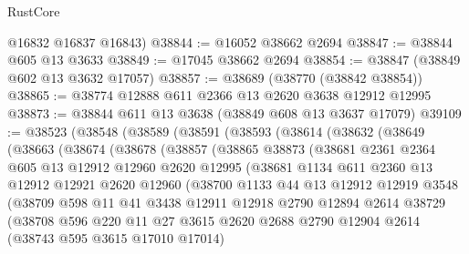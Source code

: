 \begin{lexlean}{RustCore}
\begin{coremodule}
      @16832
      @16837
      @16843)
@38844 := @16052 @38662 @2694
@38847 := @38844 @605 @13 @3633
@38849 := @17045 @38662 @2694
@38854 := @38847 (@38849 @602 @13 @3632 @17057)
@38857 := @38689 (@38770 (@38842 @38854))
@38865 := @38774 @12888 @611 @2366 @13 @2620 @3638 @12912 @12995
@38873 := @38844 @611 @13 @3638 (@38849 @608 @13 @3637 @17079)
@39109 := @38523
    (@38548
      (@38589
        (@38591
          (@38593
            (@38614
              (@38632
                (@38649
                  (@38663
                    (@38674
                      (@38678
                        (@38857
                          (@38865
                            @38873
                            (@38681
                              @2361
                              @2364
                              @605
                              @13
                              @12912
                              @12960
                              @2620
                              @12995
                              (@38681
                                @1134
                                @611
                                @2360
                                @13
                                @12912
                                @12921
                                @2620
                                @12960
                                (@38700
                                  @1133
                                  @44
                                  @13
                                  @12912
                                  @12919
                                  @3548
                                  (@38709
                                    @598
                                    @11
                                    @41
                                    @3438
                                    @12911
                                    @12918
                                    @2790
                                    @12894
                                    @2614
                                    @38729
                                    (@38708
                                      @596
                                      @220
                                      @11
                                      @27
                                      @3615
                                      @2620
                                      @2688
                                      @2790
                                      @12904
                                      @2614
                                      (@38743 @595 @3615 @17010 @17014)

\end{coremodule}
\end{lexlean}
